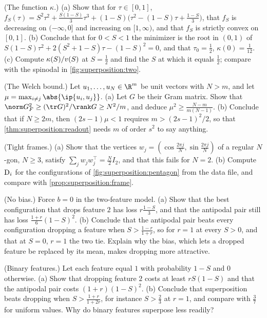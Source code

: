 \begin{refsection}
\begin{exercises}
\item \consolidation (The function $\kappa$.) (a) Show that for $\tau\in[0,1]$, $f_S(\tau)=S^2\tau^2+\frac{S(1-S)}3\tau^3+(1-S)\bigl(\tau^2-(1-S)\tau+\frac{1-S}3\bigr)$, that $f_S$ is decreasing on $(-\infty,0]$ and increasing on $[1,\infty)$, and that $f_S$ is strictly convex on $[0,1]$. (b) Conclude that for $0<S<1$ the minimizer is the root in $(0,1)$ of $S(1-S)\tau^2+2(S^2+1-S)\tau-(1-S)^2=0$, and that $\tau_0=\frac12$, $\kappa(0)=\frac1{12}$. (c) Compute $\kappa(S)/v(S)$ at $S=\frac12$ and find the $S$ at which it equals $\frac12$; compare with the spinodal in \cref{fig:superposition:two}. \label{ex:superposition:kappa}

\item \consolidation\hard (The Welch bound.) Let $u_1,\dots,u_N\in\R^m$ be unit vectors with $N>m$, and let $\mu=\max_{i\ne j}\abs{\ip{u_i,u_j}}$. (a) Let $G$ be their Gram matrix. Show that $\norm G_F^2\ge(\tr G)^2/\rank G\ge N^2/m$, and deduce $\mu^2\ge\frac{N-m}{m(N-1)}$. (b) Conclude that if $N\ge2m$, then $(2s-1)\mu<1$ requires $m>(2s-1)^2/2$, so that \cref{thm:superposition:readout} needs $m$ of order $s^2$ to say anything. \label{ex:superposition:welch}

\item \consolidation (Tight frames.) (a) Show that the vertices $w_j=(\cos\frac{2\pi j}N,\sin\frac{2\pi j}N)$ of a regular $N$-gon, $N\ge3$, satisfy $\sum_jw_jw_j^\top=\frac N2I_2$, and that this fails for $N=2$. (b) Compute $\mathrm{D}_i$ for the configurations of \cref{fig:superposition:pentagon} from the data file, and compare with \cref{prop:superposition:frame}. \label{ex:superposition:frames}

\item \variation (No bias.) Force $b=0$ in the two-feature model. (a) Show that the best configuration that drops feature $2$ has loss $r\frac{1-S}3$, and that the antipodal pair still has loss $\frac{1+r}6(1-S)^2$. (b) Conclude that the antipodal pair beats every configuration dropping a feature when $S>\frac{1-r}{1+r}$, so for $r=1$ at every $S>0$, and that at $S=0$, $r=1$ the two tie. Explain why the bias, which lets a dropped feature be replaced by its mean, makes dropping more attractive. \label{ex:superposition:nobias}

\item \variation (Binary features.) Let each feature equal $1$ with probability $1-S$ and $0$ otherwise. (a) Show that dropping feature $2$ costs at least $rS(1-S)$ and that the antipodal pair costs $(1+r)(1-S)^2$. (b) Conclude that superposition beats dropping when $S>\frac{1+r}{1+2r}$, for instance $S>\frac23$ at $r=1$, and compare with $\frac37$ for uniform values. Why do binary features superpose less readily? \label{ex:superposition:binary}


\end{exercises}
\end{refsection}
